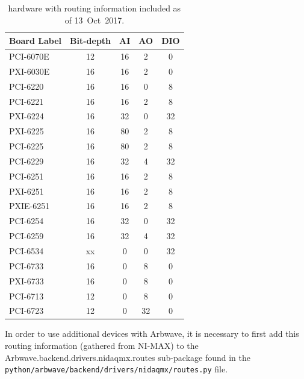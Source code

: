 \begin{table}[ht!]
\centering
  \begin{tabular}{|l|cccc|}
    \hline
    Board Label & Bit-depth & AI & AO & DIO\footnotemark \\
    \hline
    \hline
    PCI-6070E & 12 & 16 & 2 & 0  \\
    PXI-6030E & 16 & 16 & 2 & 0  \\
    PCI-6220  & 16 & 16 & 0 & 8  \\
    PCI-6221  & 16 & 16 & 2 & 8  \\
    PXI-6224  & 16 & 32 & 0 & 32 \\
    PXI-6225  & 16 & 80 & 2 & 8  \\
    PCI-6225  & 16 & 80 & 2 & 8  \\
    PCI-6229  & 16 & 32 & 4 & 32 \\
    PCI-6251  & 16 & 16 & 2 & 8  \\
    PXI-6251  & 16 & 16 & 2 & 8  \\
    PXIE-6251 & 16 & 16 & 2 & 8  \\
    PCI-6254  & 16 & 32 & 0 & 32 \\
    PCI-6259  & 16 & 32 & 4 & 32 \\
    PCI-6534  & xx &  0 & 0 & 32 \\
    PCI-6733  & 16 &  0 & 8 & 0  \\
    PXI-6733  & 16 &  0 & 8 & 0  \\
    PCI-6713  & 12 &  0 & 8 & 0  \\
    PCI-6723  & 12 &  0 & 32& 0  \\
    \hline
  \end{tabular}
  \caption{
    \label{tab:daqmx}
     hardware with routing information included as of 13~Oct~2017.
  }
\end{table}

In order to use additional  devices with Arbwave, it is
necessary to first add this routing information (gathered from NI-MAX) to the
Arbwave.backend.drivers.nidaqmx.routes sub-package found in the\\
\noindent \texttt{python/arbwave/backend/drivers/nidaqmx/routes.py} file.

